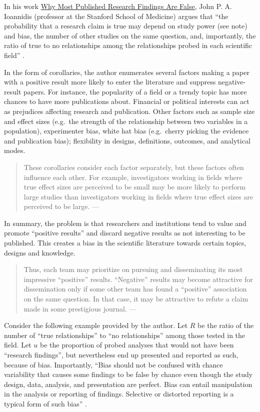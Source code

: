 \documentclass[
]{book}
\begin{document}
In his work \href{https://doi.org/10.1371/journal.pmed.0020124}{Why Most Published Research Findings Are False}, John P. A. Ioannidis (professor at the Stanford School of Medicine) argues that ``the probability that a research claim is true may depend on study power (see note) and bias, the number of other studies on the same question, and, importantly, the ratio of true to no relationships among the relationships probed in each scientific field'' \citep{ioannidis2005most}.

In the form of corollaries, the author enumerates several factors making a paper with a positive result more likely to enter the literature and suppress negative-result papers. For instance, the popularity of a field or a trendy topic has more chances to have more publications about. Financial or political interests can act as prejudices affecting research and publication. Other factors such as sample size and effect sizes (e.g.~the strength of the relationship between two variables in a population), experimenter bias, white hat bias (e.g.~cherry picking the evidence and publication bias); flexibility in designs, definitions, outcomes, and analytical modes.

\begin{quote}
These corollaries consider each factor separately, but these factors often influence each other. For example, investigators working in fields where true effect sizes are perceived to be small may be more likely to perform large studies than investigators working in fields where true effect sizes are perceived to be large. --- \citep{ioannidis2005most}
\end{quote}

In summary, the problem is that researchers and institutions tend to value and promote ``positive results'' and discard negative results as not interesting to be published. This creates a bias in the scientific literature towards certain topics, designs and knowledge.

\begin{quote}
Thus, each team may prioritize on pursuing and disseminating its most impressive ``positive'' results. ``Negative'' results may become attractive for dissemination only if some other team has found a ``positive'' association on the same question. In that case, it may be attractive to refute a claim made in some prestigious journal. --- \citep{ioannidis2005most}
\end{quote}

Consider the following example provided by the author. Let \(R\) be the ratio of the number of ``true relationships'' to ``no relationships'' among those tested in the field. Let \(u\) be the proportion of probed analyses that would not have been ``research findings'', but nevertheless end up presented and reported as such, because of bias. Importantly, ``Bias should not be confused with chance variability that causes some findings to be false by chance even though the study design, data, analysis, and presentation are perfect. Bias can entail manipulation in the analysis or reporting of findings. Selective or distorted reporting is a typical form of such bias'' \citep{ioannidis2005most}.
\end{document}
